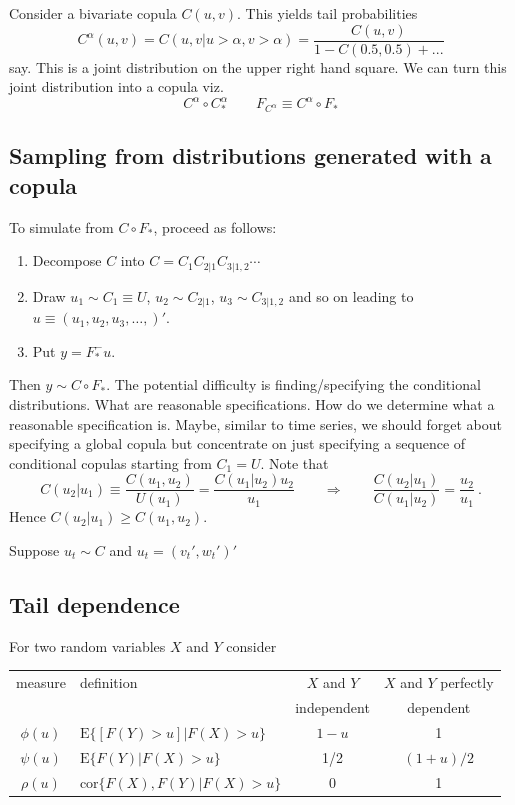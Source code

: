 \documentclass[a4paper,12pt]{article}
\newcommand{\E}{{\mathrm E}}
\begin{document}
Consider a bivariate copula $C(u,v)$.  This yields tail probabilities
$$
C^\alpha(u,v) = C(u,v|u>\alpha,v>\alpha) = \frac{C(u,v)}{1-C(0.5,0.5) + ...}
$$ say.  This is a joint distribution on the upper right hand square.  We can turn this joint distribution into a copula viz.
$$
C^\alpha\circ C^\alpha_*\qquad F_{C^\alpha} \equiv C^\alpha\circ F_*
$$

\subsection*{Sampling from distributions generated with a copula}

To simulate from $C\circ F_*$, proceed as follows:
\begin{enumerate}
    \item Decompose $C$ into $C=C_1C_{2|1}C_{3|1,2}\cdots $
    \item Draw $u_1\sim C_1\equiv U$, $u_2\sim C_{2|1}$, $u_3\sim C_{3|1,2}$ and so on leading to $u\equiv(u_1,u_2,u_3,\ldots,)'$.
    \item Put $y=F_*^-u$.
\end{enumerate}
Then $y\sim C\circ F_*$.  The potential difficulty is finding/specifying the conditional distributions.  What are reasonable specifications.  How do we determine what a reasonable specification is.   Maybe, similar to time series, we should forget about specifying a global copula but concentrate on just specifying a sequence of conditional copulas starting from $C_1=U$.  Note that
$$
C(u_2|u_1)\equiv \frac{C(u_1,u_2)}{U(u_1)}=\frac{C(u_1|u_2)u_2}{u_1}\qquad\Rightarrow\qquad\frac{C(u_2|u_1)}{C(u_1|u_2)}=\frac{u_2}{u_1}\ .
$$
Hence $C(u_2|u_1)\ge C(u_1,u_2)$.

Suppose $u_t\sim C$ and $u_t=(v_t',w_t')'$

\subsection*{Tail dependence}

For two random variables $X$ and $Y$ consider
\\


\begin{tabular}{|c|l|c|c|}
  \hline
  measure & definition & $X$ and $Y$ & $X$ and $Y$ perfectly \\
          &            & independent & dependent\\
  \hline
  $
\phi(u)$&$ \E\{[F(Y)>u]|F(X)>u\}$ & $1-u$ & 1 \\
  $ \psi(u)$&$ \E\{F(Y)|F(X)>u\}
$& 1/2& $(1+u)/2$ \\
  $ \rho(u)$&$ \mathrm{cor}\{F(X),F(Y)|F(X)>u\}$ & 0& 1 \\
  \hline
\end{tabular}
\\\\\\\\
\end{document}
